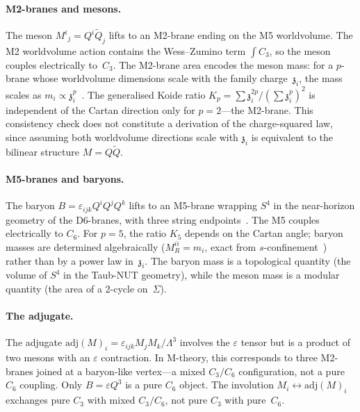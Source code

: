 \documentclass[aps,prd,twocolumn,showpacs,preprintnumbers,superscriptaddress,floatfix]{revtex4-2}
\newcommand{\adj}{\mathrm{adj}}
\newcommand{\zch}{\mathfrak{z}}
\begin{document}
\paragraph{M2-branes and mesons.}
The meson $M^i{}_j = Q^i\tilde{Q}_j$ lifts to an M2-brane
ending on the M5 worldvolume.
The M2 worldvolume action contains the Wess--Zumino term
$\int C_3$, so the meson couples electrically to~$C_3$.
The M2-brane area encodes the meson mass: for a $p$-brane
whose worldvolume dimensions scale with the family
charge~$\zch_i$, the mass scales as
$m_i \propto \zch_i^p$~\cite{Rivero:2024epjc}.
The generalised Koide ratio
$K_p = \sum \zch_i^{2p}/(\sum \zch_i^p)^2$ is independent of the
Cartan direction only for $p = 2$---the M2-brane.
This consistency check does not constitute a derivation of the
charge-squared law, since assuming both worldvolume directions
scale with $\zch_i$ is equivalent to the bilinear structure
$M = Q\tilde{Q}$.

\paragraph{M5-branes and baryons.}
The baryon $B = \varepsilon_{ijk}Q^iQ^jQ^k$ lifts to an M5-brane
wrapping $S^4$ in the near-horizon geometry of the D6-branes,
with three string
endpoints~\cite{Witten:1998baryon,HoriOoguriOz:1997}.
The M5 couples electrically to $C_6$.
For $p = 5$, the ratio $K_5$ depends on the Cartan angle;
baryon masses are determined algebraically
($M_R^{ii} = m_i$, exact from $s$-confinement~\cite{Seiberg:1994bz})
rather than by a power law in~$\zch_i$.
The baryon mass is a topological quantity (the volume of $S^4$
in the Taub-NUT geometry), while the meson mass is a modular
quantity (the area of a 2-cycle on~$\Sigma$).

\paragraph{The adjugate.}
The adjugate $\adj(M)_i = \varepsilon_{ijk} M_j M_k / \Lambda^3$
involves the $\varepsilon$ tensor but is a product of two mesons
with an $\varepsilon$ contraction.
In M-theory, this corresponds to three M2-branes joined at a
baryon-like vertex---a mixed $C_3/C_6$ configuration, not a pure
$C_6$ coupling.
Only $B = \varepsilon Q^3$ is a pure $C_6$ object.
The involution $M_i \leftrightarrow \adj(M)_i$ exchanges pure
$C_3$ with mixed $C_3/C_6$, not pure $C_3$ with pure~$C_6$.
\end{document}
